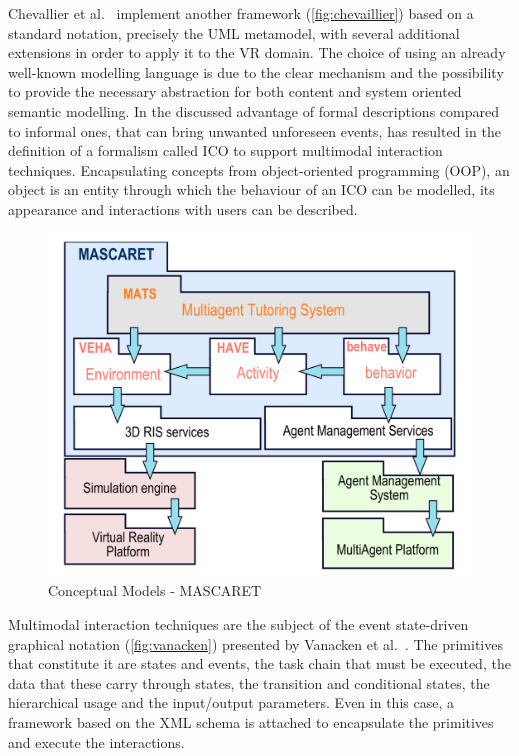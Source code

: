 Chevallier et al.~\cite{chevaillier_semantic_2012} implement another framework (\autoref{fig:chevaillier}) based on a standard notation, precisely the UML metamodel, with several additional extensions in order to apply it to the VR domain. The choice of using an already well-known modelling language is due to the clear mechanism and the possibility to provide the necessary abstraction for both content and system oriented semantic modelling. In \cite{costabile_formal_2005} the discussed advantage of formal descriptions compared to informal ones, that can bring unwanted unforeseen events, has resulted in the definition of a formalism called ICO to support multimodal interaction techniques. Encapsulating concepts from object-oriented programming (OOP), an object is an entity through which the behaviour of an ICO can be modelled, its appearance and interactions with users can be described.

\begin{figure}[h]
    \centering
    \includegraphics[width=12cm]{Figures/Background/models/chevallier.png}
    \caption{Conceptual Models - MASCARET}
    \label{fig:chevaillier}
\end{figure}

Multimodal interaction techniques are the subject of the event state-driven graphical notation (\autoref{fig:vanacken}) presented by Vanacken et al.~\cite{vanacken2006nimmit}. The primitives that constitute it are states and events, the task chain that must be executed, the data that these carry through states, the transition and conditional states, the hierarchical usage and the input/output parameters.  Even in this case, a framework based on the XML schema is attached to encapsulate the primitives and execute the interactions.

